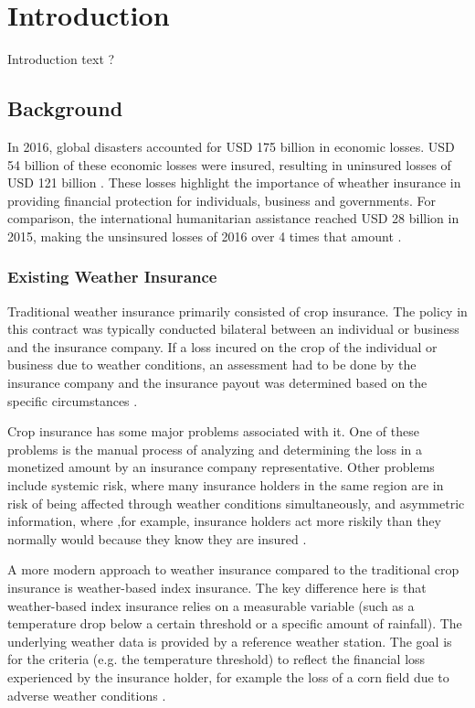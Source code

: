 \chapter{Introduction}\label{chapter:introduction} 

Introduction text ?



\section{Background}\label{section:background}
In 2016, global disasters accounted for USD 175 billion in economic losses. USD 54 billion of these economic losses were insured, resulting in uninsured losses of USD 121 billion \autocite{swissre2017}. These losses highlight the importance of wheather insurance in providing financial protection for individuals, business and governments. For comparison, the international humanitarian assistance reached USD 28 billion in 2015, making the unsinsured losses of 2016 over 4 times that amount \autocite{development2016humanitarian}.




\subsection{Existing Weather Insurance}
Traditional weather insurance primarily consisted of crop insurance. The policy in this contract was typically conducted bilateral between an individual or business and the insurance company. If  a loss incured on the crop of the individual or business due to weather conditions, an assessment had to be done by the insurance company and the insurance payout was  determined based on the specific circumstances \autocite{michler2022risk}.

 Crop insurance has some major problems associated with it. One of these problems is the manual process of analyzing and determining the loss in a monetized amount by an insurance company representative. Other problems include systemic risk, where many insurance holders in the same region are in risk of being affected through weather conditions simultaneously, and asymmetric information, where ,for example, insurance holders act more riskily than they normally would because they know they are insured \autocite{makki2002crop}.

 \sloppy A more modern approach to weather insurance compared to the traditional crop insurance is weather-based index insurance. The key difference here is that weather-based index insurance relies on a measurable variable (such as a temperature drop below a certain threshold or a specific amount of rainfall). The underlying weather data is provided by a reference weather station. The goal is for the criteria (e.g. the temperature threshold) to reflect the financial loss experienced by the insurance holder, for example the loss of a corn field due to adverse weather conditions \autocite{kajwang2022weather}.


